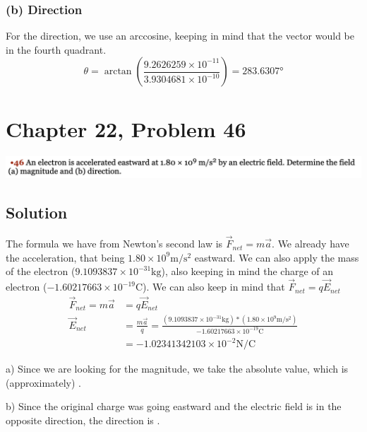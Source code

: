 \documentclass[12pt]{article}
\begin{document}
\subsubsection*{(b) Direction}
For the direction, we use an arccosine, keeping in mind that the vector would be in the fourth quadrant. 
\begin{equation*}
    \theta = \arctan\left(\frac{9.2626259 \times 10^{-11}}{3.9304681 \times 10^{-10}}\right)
        =   \boxed{283.6307 \unit{\degree}}
\end{equation*}


\pagebreak
\section*{Chapter 22, Problem 46}
\includegraphics[width=\textwidth]{picture_7.png}

\subsection*{Solution}
The formula we have from Newton's second law is $\vec{F}_{net} = m\vec{a}$. We already have the acceleration, that being $1.80 \times 10^9 \unit{\meter/\second^2}$ eastward. We can also apply the mass of the electron ($9.1093837 \times 10^{-31} \unit{\kilo\gram}$), also keeping in mind the charge of an electron ($-1.60217663 \times 10^{-19} \unit{\coulomb}$). We can also keep in mind that $\vec{F}_{net} = q \vec{E}_{net}$
\begin{align*}
    \vec{F}_{net}   =   m\vec{a}
        &=  q \vec{E}_{net}\\
    \vec{E}_{net}   &=  \frac{m\vec{a}}{q}
        =   \frac{(9.1093837 \times 10^{-31} \unit{\kilo\gram})*(1.80 \times 10^9 \unit{\meter/\second^2})}{-1.60217663 \times 10^{-19} \unit{\coulomb}}\\
        &=  -1.02341342103 \times 10^{-2} \unit{\newton/\coulomb}
\end{align*}

a) Since we are looking for the magnitude, we take the absolute value, which is (approximately) .

b) Since the original charge was going eastward and the electric field is in the opposite direction, the direction is .
\end{document}
